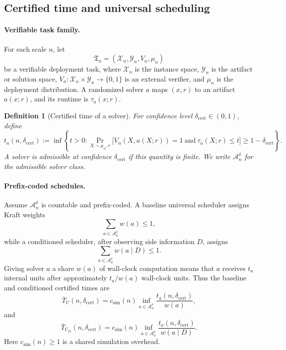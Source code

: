 \documentclass{article}
\newtheorem{definition}{Definition}
\newcommand{\cA}{\mathcal{A}}
\newcommand{\cX}{\mathcal{X}}
\newcommand{\cY}{\mathcal{Y}}
\begin{document}
\subsection{Certified time and universal scheduling}

\paragraph{Verifiable task family.}
For each scale \(n\), let
\[
    \mathfrak T_n=(\cX_n,\cY_n,V_n,\mu_n)
\]
be a verifiable deployment task, where \(\cX_n\) is the instance space, \(\cY_n\) is the
artifact or solution space, \(V_n:\cX_n\times\cY_n\to\{0,1\}\) is an external verifier, and
\(\mu_n\) is the deployment distribution.
A randomized solver \(a\) maps \((x,r)\) to an artifact \(a(x;r)\), and its runtime is
\(\tau_a(x;r)\).

\begin{definition}[Certified time of a solver]
\label{def:app-certified-time}
For confidence level \(\delta_{\mathrm{cert}}\in(0,1)\), define
\[
    t_a(n,\delta_{\mathrm{cert}})
    :=
    \inf\left\{
        t>0:
        \Pr_{X\sim\mu_n,r}
        \big[
            V_n(X,a(X;r))=1
            \ \mathrm{and}\
            \tau_a(X;r)\le t
        \big]
        \ge 1-\delta_{\mathrm{cert}}
    \right\}.
\]
A solver is admissible at confidence \(\delta_{\mathrm{cert}}\) if this quantity is finite.
We write \(\cA_n^\delta\) for the admissible solver class.
\end{definition}

\paragraph{Prefix-coded schedules.}
Assume \(\cA_n^\delta\) is countable and prefix-coded.
A baseline universal scheduler assigns Kraft weights
\[
    \sum_{a\in\cA_n^\delta} w(a)\le 1,
\]
while a conditioned scheduler, after observing side information \(D\), assigns
\[
    \sum_{a\in\cA_n^\delta} w(a\mid D)\le 1.
\]
Giving solver \(a\) a share \(w(a)\) of wall-clock computation means that \(a\) receives
\(t_a\) internal units after approximately \(t_a/w(a)\) wall-clock units.  Thus the baseline
and conditioned certified times are
\[
    \overline T_U(n,\delta_{\mathrm{cert}})
    =
    c_{\mathrm{sim}}(n)
    \inf_{a\in\cA_n^\delta}
    \frac{t_a(n,\delta_{\mathrm{cert}})}{w(a)},
\]
and
\[
    \overline T_{U_D}(n,\delta_{\mathrm{cert}})
    =
    c_{\mathrm{sim}}(n)
    \inf_{a\in\cA_n^\delta}
    \frac{t_a(n,\delta_{\mathrm{cert}})}{w(a\mid D)}.
\]
Here \(c_{\mathrm{sim}}(n)\ge 1\) is a shared simulation overhead.
\end{document}
